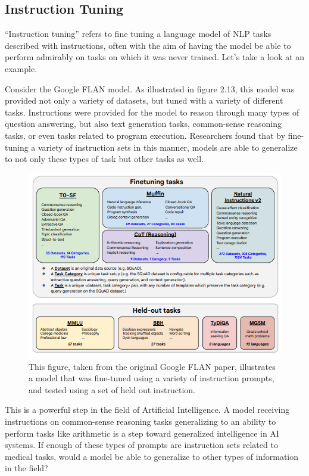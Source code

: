 \subsection{Instruction Tuning}

“Instruction tuning” refers to fine tuning a language model of NLP tasks described with instructions, often with the aim of having the model
be able to perform admirably on tasks on which it was never trained. Let's take a look at an example.

Consider the Google FLAN\cite{chung2022scaling} model. As illustrated in figure 2.13, this model was provided not only a variety of datasets, but
tuned with a variety of different tasks. Instructions were provided for the model to reason through many types of question answering, but also text
generation tasks, common-sense reasoning tasks, or even tasks related to program execution. Researchers found that by fine-tuning a variety of instruction
sets in this manner, models are able to generalize to not only these types of task but other tasks as well.

\begin{figure}
  \includegraphics[width=\linewidth]{chapters/NLP/figures/flan_finetune.png}
  \caption{This figure, taken from the original Google FLAN paper, illustrates a model that was fine-tuned using a variety of instruction prompts, and tested using a set of held out instruction.}
  \label{fig:flan_instruction_fine_tuning}
\end{figure}

This is a powerful step in the field of Artificial Intelligence. A model receiving instructions on common-sense reasoning tasks generalizing to an ability to perform tasks like arithmetic is a step
toward generalized intelligence in AI systems. If enough of these types of prompts are instruction sets related to medical tasks, would a model be able to generalize to other types of information in the field?

